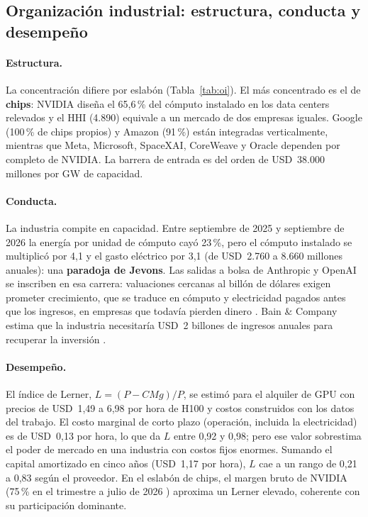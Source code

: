 \documentclass[11pt,a4paper]{article}
\begin{document}
\subsection{Organización industrial: estructura, conducta y desempeño}

\paragraph{Estructura.} La concentración difiere por eslabón (Tabla~\ref{tab:oi}). El más concentrado es el de \textbf{chips}: NVIDIA diseña el 65,6\,\% del cómputo instalado en los data centers relevados y el HHI (4.890) equivale a un mercado de dos empresas iguales. Google (100\,\% de chips propios) y Amazon (91\,\%) están integradas verticalmente, mientras que Meta, Microsoft, SpaceXAI, CoreWeave y Oracle dependen por completo de NVIDIA. La barrera de entrada es del orden de USD~38.000 millones por GW de capacidad.

\paragraph{Conducta.} La industria compite en capacidad. Entre septiembre de 2025 y septiembre de 2026 la energía por unidad de cómputo cayó 23\,\%, pero el cómputo instalado se multiplicó por 4,1 y el gasto eléctrico por 3,1 (de USD~2.760 a 8.660 millones anuales): una \textbf{paradoja de Jevons}. Las salidas a bolsa de Anthropic y OpenAI se inscriben en esa carrera: valuaciones cercanas al billón de dólares exigen prometer crecimiento, que se traduce en cómputo y electricidad pagados antes que los ingresos, en empresas que todavía pierden dinero \cite{fortuneap}. Bain \& Company estima que la industria necesitaría USD~2 billones de ingresos anuales para recuperar la inversión \cite{wm}.

\paragraph{Desempeño.} El índice de Lerner, $L=(P-CMg)/P$, se estimó para el alquiler de GPU con precios de USD~1,49 a 6,98 por hora de H100 \cite{intuition} y costos construidos con los datos del trabajo. El costo marginal de corto plazo (operación, incluida la electricidad) es de USD~0,13 por hora, lo que da $L$ entre 0,92 y 0,98; pero ese valor sobrestima el poder de mercado en una industria con costos fijos enormes. Sumando el capital amortizado en cinco años (USD~1,17 por hora), $L$ cae a un rango de 0,21 a 0,83 según el proveedor. En el eslabón de chips, el margen bruto de NVIDIA (75\,\% en el trimestre a julio de 2026 \cite{nvidia}) aproxima un Lerner elevado, coherente con su participación dominante.
\end{document}

